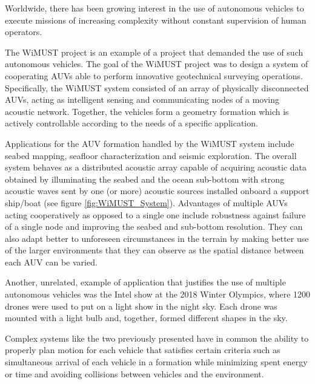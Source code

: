 \par Worldwide, there has been growing interest in the use of autonomous vehicles to execute missions of increasing complexity without constant supervision of human operators. 
\par The WiMUST project \cite{sonar_tec_overview} is an example of a project that demanded the use of such autonomous vehicles. The goal of the WiMUST project was to design a system of cooperating \acp{AUV} able to perform innovative geotechnical surveying operations. Specifically, the WiMUST system consisted of an array of physically disconnected \acp{AUV}, acting as intelligent sensing and communicating nodes of a moving acoustic network. Together, the vehicles form a geometry formation which is actively controllable according to the needs of a specific application. 
\par Applications for the \ac{AUV} formation handled by the WiMUST system include seabed mapping, seafloor characterization and seismic exploration. The overall system behaves as a distributed acoustic array capable of acquiring acoustic data obtained by illuminating the seabed and the ocean sub-bottom with strong acoustic waves sent by one (or more) acoustic sources installed onboard a support ship/boat (see figure \ref{fig:WiMUST_System}). Advantages of multiple \acp{AUV} acting cooperatively as opposed to a single one include robustness against failure of a single node and improving the seabed and sub-bottom resolution. They can also adapt better to unforeseen circumstances in the terrain by making better use of the larger environments that they can observe as the spatial distance between each \ac{AUV} can be varied. 
\par Another, unrelated, example of application that justifies the use of multiple autonomous vehicles was the Intel show at the 2018 Winter Olympics, where 1200 drones were used to put on a light show in the night sky. Each drone was mounted with a light bulb and, together, formed different shapes in the sky.
\par Complex systems like the two previously presented have in common the ability to properly plan motion for each vehicle that satisfies certain criteria such as simultaneous arrival of each vehicle in a formation while minimizing spent energy or time and avoiding collisions between vehicles and the environment.
